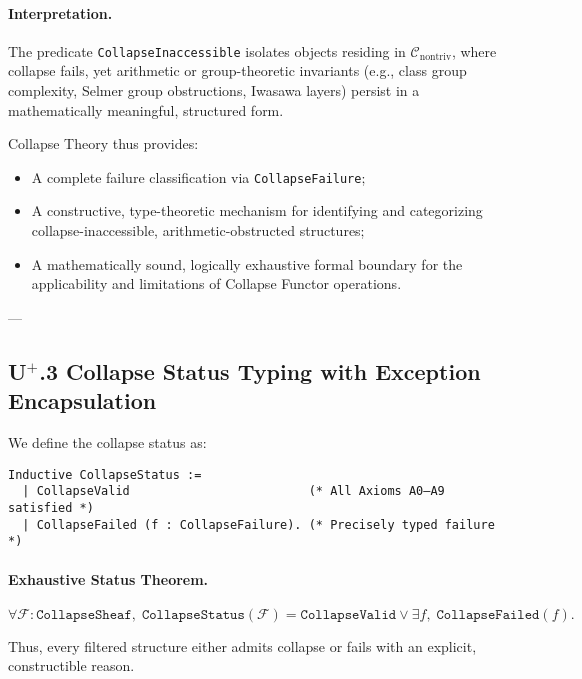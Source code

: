 \documentclass[11pt]{article}
\begin{document}
\paragraph{Interpretation.}

The predicate \texttt{CollapseInaccessible} isolates objects residing in $\mathcal{C}_{\mathrm{nontriv}}$, where collapse fails, yet arithmetic or group-theoretic invariants (e.g., class group complexity, Selmer group obstructions, Iwasawa layers) persist in a mathematically meaningful, structured form.

Collapse Theory thus provides:

\begin{itemize}
    \item A complete failure classification via \texttt{CollapseFailure};
    \item A constructive, type-theoretic mechanism for identifying and categorizing collapse-inaccessible, arithmetic-obstructed structures;
    \item A mathematically sound, logically exhaustive formal boundary for the applicability and limitations of Collapse Functor operations.
\end{itemize}

---

\subsection*{U$^{+}$.3 Collapse Status Typing with Exception Encapsulation}

We define the collapse status as:

\begin{lstlisting}[language=Coq]
Inductive CollapseStatus :=
  | CollapseValid                         (* All Axioms A0–A9 satisfied *)
  | CollapseFailed (f : CollapseFailure). (* Precisely typed failure *)
\end{lstlisting}

\paragraph{Exhaustive Status Theorem.}

\[
\forall \mathcal{F} : \texttt{CollapseSheaf},\;
\texttt{CollapseStatus}(\mathcal{F}) = \texttt{CollapseValid} \lor \exists f,\; \texttt{CollapseFailed}(f).
\]

Thus, every filtered structure either admits collapse or fails with an explicit, constructible reason.
\end{document}
